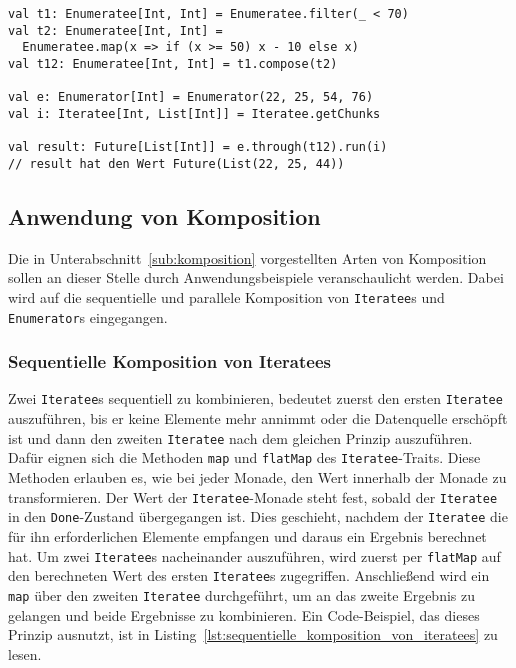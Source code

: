 \begin{lstlisting}[caption=Enumerateeanwendung auf Enumeratees, label=lst:enumerateeanwendung_auf_enumeratees]
val t1: Enumeratee[Int, Int] = Enumeratee.filter(_ < 70)
val t2: Enumeratee[Int, Int] =
  Enumeratee.map(x => if (x >= 50) x - 10 else x)
val t12: Enumeratee[Int, Int] = t1.compose(t2)

val e: Enumerator[Int] = Enumerator(22, 25, 54, 76)
val i: Iteratee[Int, List[Int]] = Iteratee.getChunks

val result: Future[List[Int]] = e.through(t12).run(i)
// result hat den Wert Future(List(22, 25, 44))
\end{lstlisting}




\subsection{Anwendung von Komposition} %
\label{sub:anwendung_komposition}

Die in Unterabschnitt~\ref{sub:komposition} vorgestellten Arten von Komposition sollen an dieser Stelle durch Anwendungsbeispiele veranschaulicht werden.
Dabei wird auf die sequentielle und parallele Komposition von \lstinline|Iteratee|s und \lstinline|Enumerator|s eingegangen.

\subsubsection{Sequentielle Komposition von Iteratees} %
\label{ssub:anwendung_sequentielle_komposition_von_iteratees}

Zwei \lstinline|Iteratee|s sequentiell zu kombinieren, bedeutet zuerst den ersten \lstinline|Iteratee| auszuführen, bis er keine Elemente mehr annimmt oder die Datenquelle erschöpft ist und dann den zweiten \lstinline|Iteratee| nach dem gleichen Prinzip auszuführen.
Dafür eignen sich die Methoden \lstinline|map| und \lstinline|flatMap| des \lstinline|Iteratee|-Traits.
Diese Methoden erlauben es, wie bei jeder Monade, den Wert innerhalb der Monade zu transformieren.
Der Wert der \lstinline|Iteratee|-Monade steht fest, sobald der \lstinline|Iteratee| in den \lstinline|Done|-Zustand übergegangen ist.
Dies geschieht, nachdem der \lstinline|Iteratee| die für ihn erforderlichen Elemente empfangen und daraus ein Ergebnis berechnet hat.
Um zwei \lstinline|Iteratee|s nacheinander auszuführen, wird zuerst per \lstinline|flatMap| auf den berechneten Wert des ersten \lstinline|Iteratee|s zugegriffen.
Anschließend wird ein \lstinline|map| über den zweiten \lstinline|Iteratee| durchgeführt, um an das zweite Ergebnis zu gelangen und beide Ergebnisse zu kombinieren.
Ein Code-Beispiel, das dieses Prinzip ausnutzt, ist in Listing~\ref{lst:sequentielle_komposition_von_iteratees} zu lesen.

